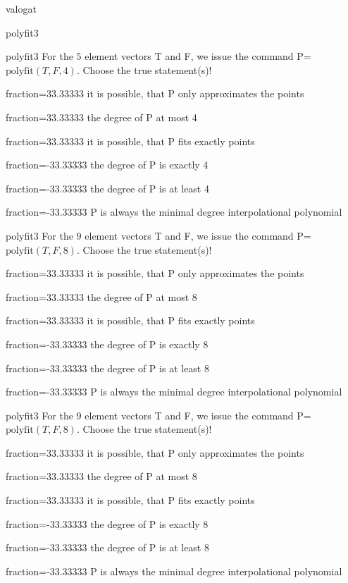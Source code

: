 \documentclass[12pt]{article}
\begin{document}
\begin{quiz}{valogat}
\begin{multi}[single=false]{polyfit3}
\end{multi}
\begin{multi}[single=false]{polyfit3}
For the $5$ element vectors T and F, we issue the command P=$\mathrm{polyfit}(T,F,4)$.
Choose the true statement(s)!
\item[fraction=33.33333] it is possible, that P only approximates the points
\item[fraction=33.33333] the degree of P at most 4
\item[fraction=33.33333] it is possible, that P fits exactly points
\item[fraction=-33.33333]  the degree of P is exactly 4
\item[fraction=-33.33333]  the degree of P is at least 4
\item[fraction=-33.33333]  P is always the minimal degree interpolational polynomial
\end{multi}
\begin{multi}[single=false]{polyfit3}
For the $9$ element vectors T and F, we issue the command P=$\mathrm{polyfit}(T,F,8)$.
Choose the true statement(s)!
\item[fraction=33.33333] it is possible, that P only approximates the points
\item[fraction=33.33333] the degree of P at most 8
\item[fraction=33.33333] it is possible, that P fits exactly points
\item[fraction=-33.33333]  the degree of P is exactly 8
\item[fraction=-33.33333]  the degree of P is at least 8
\item[fraction=-33.33333]  P is always the minimal degree interpolational polynomial
\end{multi}
\begin{multi}[single=false]{polyfit3}
For the $9$ element vectors T and F, we issue the command P=$\mathrm{polyfit}(T,F,8)$.
Choose the true statement(s)!
\item[fraction=33.33333] it is possible, that P only approximates the points
\item[fraction=33.33333] the degree of P at most 8
\item[fraction=33.33333] it is possible, that P fits exactly points
\item[fraction=-33.33333]  the degree of P is exactly 8
\item[fraction=-33.33333]  the degree of P is at least 8
\item[fraction=-33.33333]  P is always the minimal degree interpolational polynomial

\end{multi}
\end{quiz}
\end{document}
